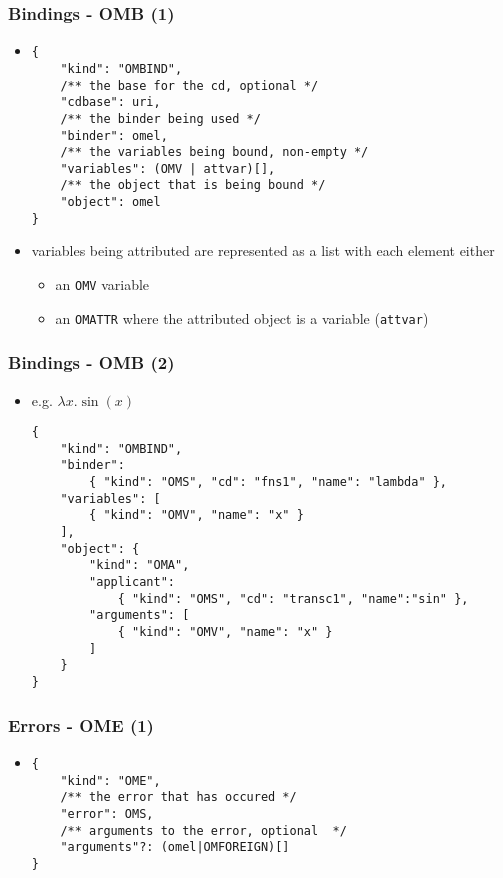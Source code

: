 \documentclass[usenames,dvipsnames]{beamer}
\begin{document}
\begin{frame}[fragile]
    \frametitle{Bindings - OMB (1)}
    \begin{itemize}
        \item
\begin{lstlisting}
{
    "kind": "OMBIND", 
    /** the base for the cd, optional */
    "cdbase": uri, 
    /** the binder being used */
    "binder": omel,
    /** the variables being bound, non-empty */
    "variables": (OMV | attvar)[],
    /** the object that is being bound */
    "object": omel
}
    \end{lstlisting}
        \item variables being attributed are represented as a list with each element either
        \begin{itemize}
            \item an \texttt{OMV} variable
            \item an \texttt{OMATTR} where the attributed object is a variable (\texttt{attvar})
        \end{itemize}
    \end{itemize}
\end{frame}

\begin{frame}[fragile]
    \frametitle{Bindings - OMB (2)}
    \begin{itemize}
        \item e.g. $\lambda x . \sin(x)$
\begin{lstlisting}
{  
    "kind": "OMBIND",
    "binder": 
        { "kind": "OMS", "cd": "fns1", "name": "lambda" },
    "variables": [  
        { "kind": "OMV", "name": "x" }
    ],
    "object": {  
        "kind": "OMA",
        "applicant":
            { "kind": "OMS", "cd": "transc1", "name":"sin" },
        "arguments": [
            { "kind": "OMV", "name": "x" }
        ]
    }
}
\end{lstlisting}
    \end{itemize}
\end{frame}

\begin{frame}[fragile]
    \frametitle{Errors - OME (1)}
    \begin{itemize}
        \item
\begin{lstlisting}
{
    "kind": "OME", 
    /** the error that has occured */
    "error": OMS,
    /** arguments to the error, optional  */
    "arguments"?: (omel|OMFOREIGN)[]
}
    \end{lstlisting}
    \end{itemize}
\end{frame}
\end{document}
